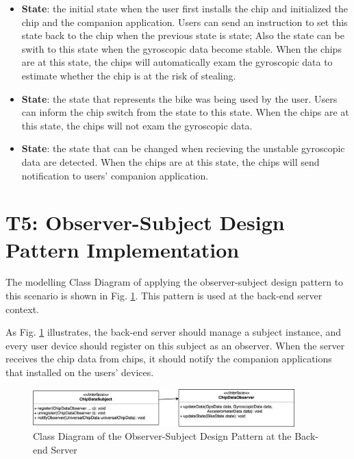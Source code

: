 \documentclass[conference]{IEEEtran}
\begin{document}
\begin{itemize}
	\item [1.] \textbf{ State}: the initial state when the user first installs the chip and initialized the chip and the companion application.
	      Users can send an instruction to set this state back to the chip when the previous state is  state;
	      Also the  state can be swith to this state when the gyroscopic data become stable.
	      When the chips are at this state, the chips will automatically exam the gyroscopic data to estimate whether the chip is at the risk of stealing.
	\item [2.] \textbf{ State}: the state that represents the bike was being used by the user.
	      Users can inform the chip switch from the  state to this state.
	      When the chips are at this state, the chips will not exam the gyroscopic data.
	\item [3.] \textbf{ State}: the state that can be changed when recieving the unstable gyroscopic data are detected.
	      When the chips are at this state, the chips will send notification to users' companion application.
\end{itemize}

\section{T5: Observer-Subject Design Pattern Implementation}


The modelling Class Diagram of applying the observer-subject design pattern to this scenario is shown in Fig. \ref{fig:osp}.
This pattern is used at the back-end server context.

As Fig. \ref{fig:osp} illustrates, the back-end server should manage a subject instance,
and every user device should register on this subject as an observer.
When the server receives the chip data from chips, it should notify the companion applications that installed on the users' devices.

\begin{figure}[!ht]
	\centering
	\includegraphics[width=0.9\textwidth]{./img/observer-subject-pattern.png}
	\caption{Class Diagram of the Observer-Subject Design Pattern at the Back-end Server}
	\label{fig:osp}
\end{figure}
\end{document}
